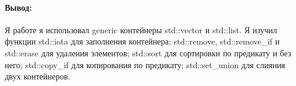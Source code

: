 \paragraph{Вывод:}
Я работе я использовал generic контейнеры std::vector и std::list.
Я изучил функции std::iota для заполнения контейнера;
std::remove, std::remove\_if и std::erase для удаления элементов;
std::sort для сортировки по предикату и без него;
std::copy\_if для копирования по предикату;
std::set\_union для слияния двух контейнеров.